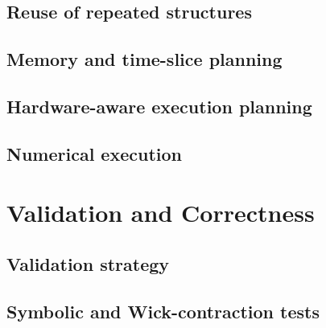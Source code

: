 \documentclass[11pt]{article}
\begin{document}
\subsection{Reuse of repeated structures}


\subsection{Memory and time-slice planning}


\subsection{Hardware-aware execution planning}


\subsection{Numerical execution}


\section{Validation and Correctness}
\label{sec:validation}


\subsection{Validation strategy}


\subsection{Symbolic and Wick-contraction tests}
\end{document}
